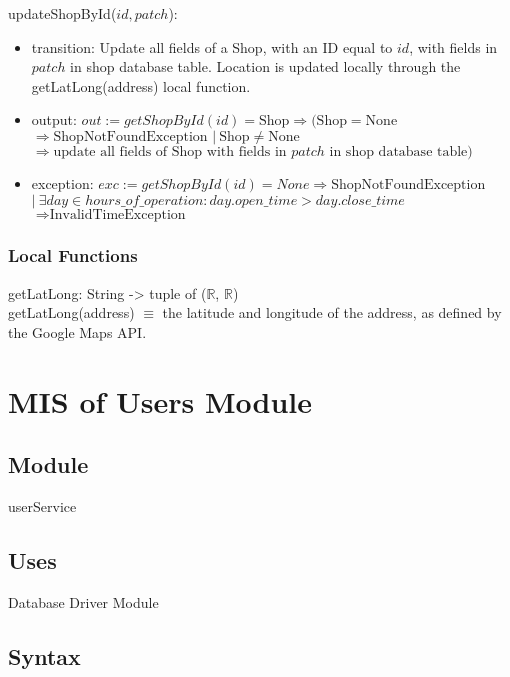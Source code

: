 \documentclass[12pt, titlepage]{article}
\begin{document}
\noindent updateShopById($id, patch$):
\begin{itemize}
	\item transition: Update all fields of a Shop, with an ID equal to $id$, with fields in $patch$ in shop
	      database table. Location is updated locally through the getLatLong(address) local function.
	\item output: $out := getShopById(id) = \text{Shop} \Rightarrow (\text{Shop} = \text{None} $ \\
		      $\Rightarrow \text{ShopNotFoundException } |\ \text{Shop} \neq \text{None}$ \\ $\Rightarrow
		      \text{update all fields of Shop with fields in } patch \text{ in shop database table})$
	\item exception: $exc := getShopById(id) = None \Rightarrow \text{ShopNotFoundException}$ \\ $|\ \exists
		      day \in hours\_of\_operation : day.open\_time > day.close\_time$ \\ $\Rightarrow
		      \text{InvalidTimeException}$
\end{itemize}

\subsubsection{Local Functions}

getLatLong: String -> tuple of ($\mathbb{R}$, $\mathbb{R}$) \\

getLatLong(address) $\equiv$ the latitude and longitude of the address, as defined by the Google
Maps API. \\ \newpage

\section{MIS of Users Module} \label{mUsers}
\subsection{Module}

userService

\subsection{Uses}

Database Driver Module

\subsection{Syntax}
\end{document}
